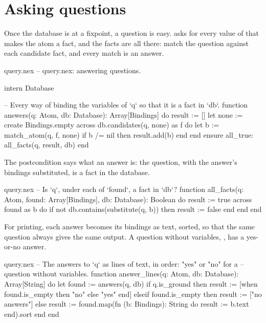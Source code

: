 \chapter{Asking questions}\label{ch:queries}

Once the database is at a fixpoint, a question is easy.  asks for every value of  that makes the atom a fact, and the
facts are all there: match the question against each candidate fact, and
every match is an answer.

\begin{newfile}{query.nex}
-- query.nex: answering questions.

intern Database

-- Every way of binding the variables of `q` so that it is a fact in `db`.
function answers(q: Atom, db: Database): Array[Bindings]
do
  result := []
  let none := create Bindings.empty
  across db.candidates(q, none) as f do
    let b := match_atom(q, f, none)
    if b /= nil then
      result.add(b)
    end
  end
ensure
  all_true: all_facts(q, result, db)
end
\end{newfile}

The postcondition says what an answer is: the question, with the answer's
bindings substituted, is a fact in the database.

\begin{continued}{query.nex}
-- Is `q`, under each of `found`, a fact in `db`?
function all_facts(q: Atom, found: Array[Bindings], db: Database): Boolean
do
  result := true
  across found as b do
    if not db.contains(substitute(q, b)) then
      result := false
    end
  end
end
\end{continued}

For printing, each answer becomes its bindings as text, sorted, so that the
same question always gives the same output. A question without variables,
, has a yes-or-no answer.

\begin{continued}{query.nex}
-- The answers to `q` as lines of text, in order: "yes" or "no" for a
-- question without variables.
function answer_lines(q: Atom, db: Database): Array[String]
do
  let found := answers(q, db)
  if q.is_ground then
    result := [when found.is_empty then "no" else "yes" end]
  elseif found.is_empty then
    result := ["no answers"]
  else
    result := found.map(fn (b: Bindings): String do
      result := b.text
    end).sort
  end
end
\end{continued}

